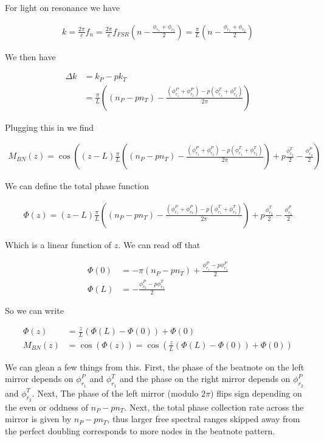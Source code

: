\documentclass[12pt]{article}
\begin{document}
For light on resonance we have

\begin{align}
k = \frac{2\pi}{c} f_n = \frac{2\pi}{c} f_{FSR}\left(n - \frac{\phi_{r_1}+\phi_{r_2}}{2} \right) = \frac{\pi}{L}\left(n - \frac{\phi_{r_1}+\phi_{r_2}}{2} \right)
\end{align}

We then have

\begin{align}
\Delta k &= k_P - p k_T\\
&=\frac{\pi}{L} \left((n_P-pn_T) - \frac{(\phi_{r_1}^P + \phi_{r_2}^P) - p(\phi_{r_1}^T+\phi_{r_2}^T)}{2\pi}\right)
\end{align}

Plugging this in we find

\begin{align}
M_{BN}(z) = \cos\left((z-L)\frac{\pi}{L} \left((n_P-pn_T) - \frac{(\phi_{r_1}^P + \phi_{r_2}^P) - p(\phi_{r_1}^T+\phi_{r_2}^T)}{2\pi}\right)+ p\frac{\phi_{r_2}^T}{2} - \frac{\phi_{r_2}^P}{2}  \right)
\end{align}

We can define the total phase function

\begin{align}
\Phi(z) = (z-L)\frac{\pi}{L} \left((n_P-pn_T) - \frac{(\phi_{r_1}^P + \phi_{r_2}^P) - p(\phi_{r_1}^T+\phi_{r_2}^T)}{2\pi}\right)+ p\frac{\phi_{r_2}^T}{2} - \frac{\phi_{r_2}^P}{2}
\end{align}

Which is a linear function of $z$. We can read off that

\begin{align}
\Phi(0) &= -\pi(n_P-pn_T) + \frac{\phi_{r_1}^P-p\phi_{r_1}^P}{2}\\
\Phi(L) &= -\frac{\phi_{r_2}^P-p\phi_{r_2}^T}{2}
\end{align}


So we can write

\begin{align}
\Phi(z) &= \frac{z}{L} (\Phi(L)-\Phi(0)) + \Phi(0)\\
M_{BN}(z) &= \cos(\Phi(z)) = \cos\left(\frac{z}{L}(\Phi(L)-\Phi(0)) + \Phi(0)\right)
\end{align}

We can glean a few things from this. First, the phase of the beatnote on the left mirror depends on $\phi_{r_1}^P$ and $\phi_{r_1}^T$ and the phase on the right mirror depends on $\phi_{r_2}^P$ and $\phi_{r_2}^T$. Next, The phase of the left mirror (modulo $2\pi$) flips sign depending on the even or oddness of $n_P-p n_T$. Next, the total phase collection rate across the mirror is given by $n_P-pn_T$, thus larger free spectral ranges skipped away from the perfect doubling corresponds to more nodes in the beatnote pattern.
\end{document}
